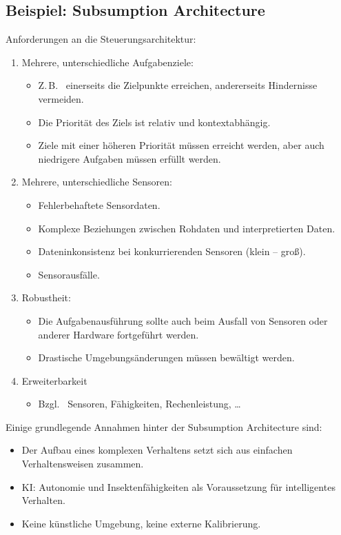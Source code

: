 		\subsection{Beispiel: Subsumption Architecture}
			Anforderungen an die Steuerungsarchitektur:
			\begin{enumerate}
				\item Mehrere, unterschiedliche Aufgabenziele:
					\begin{itemize}
						\item Z.\,B.~ einerseits die Zielpunkte erreichen, andererseits Hindernisse vermeiden.
						\item Die Priorität des Ziels ist relativ und kontextabhängig.
						\item Ziele mit einer höheren Priorität müssen erreicht werden, aber auch niedrigere Aufgaben müssen erfüllt werden.
					\end{itemize}
				\item Mehrere, unterschiedliche Sensoren:
					\begin{itemize}
						\item Fehlerbehaftete Sensordaten.
						\item Komplexe Beziehungen zwischen Rohdaten und interpretierten Daten.
						\item Dateninkonsistenz bei konkurrierenden Sensoren (klein -- groß).
						\item Sensorausfälle.
					\end{itemize}
				\item Robustheit:
					\begin{itemize}
						\item Die Aufgabenausführung sollte auch beim Ausfall von Sensoren oder anderer Hardware fortgeführt werden.
						\item Drastische Umgebungsänderungen müssen bewältigt werden.
					\end{itemize}
				\item Erweiterbarkeit
					\begin{itemize}
						\item Bzgl.~ Sensoren, Fähigkeiten, Rechenleistung, \dots
					\end{itemize}
			\end{enumerate}
		
			Einige grundlegende Annahmen hinter der Subsumption Architecture sind:
			\begin{itemize}
				\item Der Aufbau eines komplexen Verhaltens setzt sich aus einfachen Verhaltensweisen zusammen.
				\item KI: Autonomie und Insektenfähigkeiten als Voraussetzung für intelligentes Verhalten.
				\item Keine künstliche Umgebung, keine externe Kalibrierung.
			\end{itemize}
		
